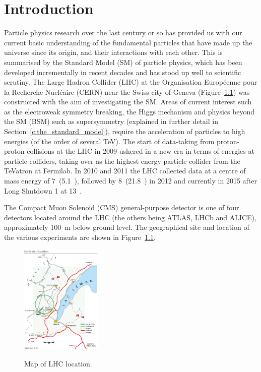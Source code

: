 \chapter{Introduction}
\label{c:introduction}

Particle physics research over the last century or so has provided us with our current basic understanding of
the fundamental particles that have made up the universe since its origin, and their interactions with each
other. This is summarised by the Standard Model (SM) of particle physics, which has been developed
incrementally in recent decades and has stood up well to scientific scrutiny. The Large Hadron Collider (LHC)
at the Organisation Europ\'{e}enne pour la Recherche Nucl\'{e}aire (CERN) near the Swiss city of Geneva
(Figure~\ref{fig:LHC_map}) was constructed with the aim of investigating the SM. Areas of current interest
such as the electroweak symmetry breaking, the Higgs mechanism and physics beyond the SM (BSM) such
as supersymmetry (explained in further detail in Section~\ref{c:the_standard_model}), require
the acceleration of particles to high energies (of the order of several TeV). The start of data-taking from proton-proton collisions at the
LHC in 2009 ushered in a new era in terms of energies at particle colliders, taking over as the highest energy
particle collider from the TeVatron at Fermilab. In 2010 and 2011 the LHC collected data at a centre of mass
energy of 7~\TeV (5.1~\fbinv), followed by 8~\TeV (21.8~\fbinv) in 2012 and currently in 2015 after Long
Shutdown 1 at 13~\TeV.

The Compact Muon Solenoid (CMS) general-purpose detector is one of four detectors located around the LHC (the
others being ATLAS, LHCb and ALICE), approximately 100~m below ground level. The geographical site and
location of the various experiments are shown in Figure~\ref{fig:LHC_map}.

\begin{figure}[hbtp]
   \centering
     \includegraphics[width=0.35\textwidth]{Chapters/01_Introduction/Images/lhc-pho-1997-169.jpg}\\
     \caption{Map of LHC location.}
     \label{fig:LHC_map}
\end{figure}

